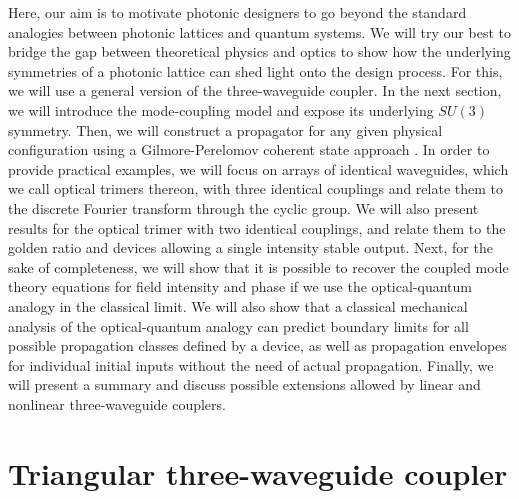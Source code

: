 \documentclass[9pt,twocolumn,twoside]{osajnl}
\begin{document}
Here, our aim is to motivate photonic designers to go beyond the standard analogies between photonic lattices and quantum systems. 
We will try our best to bridge the gap between theoretical physics and optics to show how the underlying symmetries of a photonic lattice can shed light onto the design process. 
For this, we will use a general version of the three-waveguide coupler.
In the next section, we will introduce the mode-coupling model and expose its underlying $SU(3)$ symmetry. 
Then, we will construct a propagator for any given physical configuration using a Gilmore-Perelomov coherent state approach \cite{VillanuevaVergara2015p}.
In order to provide practical examples, we will focus on arrays of identical waveguides, which we call optical trimers thereon, with three identical couplings and relate them to the discrete Fourier transform through the cyclic group.
We will also present results for the optical trimer with two identical couplings, and relate them to the golden ratio and devices allowing a single intensity stable output. 
Next, for the sake of completeness, we will show that it is possible to recover the coupled mode theory equations for field intensity and phase if we use the optical-quantum analogy in the classical limit.
We will also show that a classical mechanical analysis of the optical-quantum analogy can predict boundary limits for all possible propagation classes defined by a device, as well as propagation envelopes for individual initial inputs without the need of actual propagation.
Finally, we will present a summary and discuss possible extensions allowed by linear and nonlinear three-waveguide couplers.


\section{Triangular three-waveguide coupler}
\end{document}
